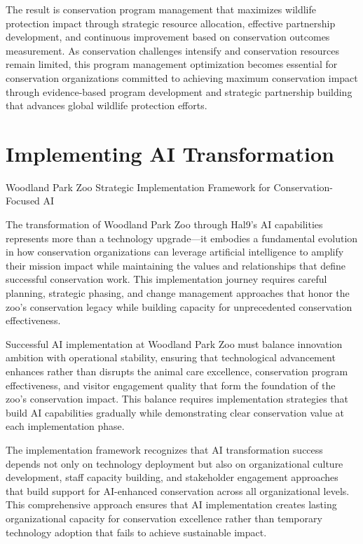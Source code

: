 \documentclass[
  Letterpaper,
]{scrbook}
\begin{document}
The result is conservation program management that maximizes wildlife
protection impact through strategic resource allocation, effective
partnership development, and continuous improvement based on
conservation outcomes measurement. As conservation challenges intensify
and conservation resources remain limited, this program management
optimization becomes essential for conservation organizations committed
to achieving maximum conservation impact through evidence-based program
development and strategic partnership building that advances global
wildlife protection efforts.


\chapter{Implementing AI
Transformation}\label{implementing-ai-transformation}

Woodland Park Zoo Strategic Implementation Framework for
Conservation-Focused AI

\hfill\break

The transformation of Woodland Park Zoo through Hal9's AI capabilities
represents more than a technology upgrade---it embodies a fundamental
evolution in how conservation organizations can leverage artificial
intelligence to amplify their mission impact while maintaining the
values and relationships that define successful conservation work. This
implementation journey requires careful planning, strategic phasing, and
change management approaches that honor the zoo's conservation legacy
while building capacity for unprecedented conservation effectiveness.

Successful AI implementation at Woodland Park Zoo must balance
innovation ambition with operational stability, ensuring that
technological advancement enhances rather than disrupts the animal care
excellence, conservation program effectiveness, and visitor engagement
quality that form the foundation of the zoo's conservation impact. This
balance requires implementation strategies that build AI capabilities
gradually while demonstrating clear conservation value at each
implementation phase.

The implementation framework recognizes that AI transformation success
depends not only on technology deployment but also on organizational
culture development, staff capacity building, and stakeholder engagement
approaches that build support for AI-enhanced conservation across all
organizational levels. This comprehensive approach ensures that AI
implementation creates lasting organizational capacity for conservation
excellence rather than temporary technology adoption that fails to
achieve sustainable impact.
\end{document}
